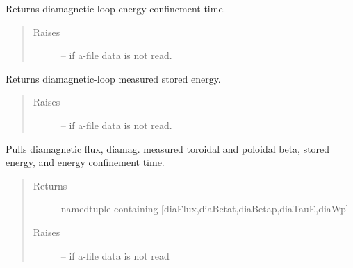 \documentclass[letterpaper,10pt,english]{sphinxmanual}
\begin{document}
\begin{fulllineitems}
\begin{fulllineitems}
\end{fulllineitems}


\begin{fulllineitems}
\label{eqtools:eqtools.eqdskreader.EqdskReader.getDiamagTauE}
Returns diamagnetic-loop energy confinement time.
\begin{quote}\begin{description}
\item[{Raises}] \leavevmode
{} -- if a-file data is not read.

\end{description}\end{quote}

\end{fulllineitems}


\begin{fulllineitems}
\label{eqtools:eqtools.eqdskreader.EqdskReader.getDiamagWp}
Returns diamagnetic-loop measured stored energy.
\begin{quote}\begin{description}
\item[{Raises}] \leavevmode
{} -- if a-file data is not read.

\end{description}\end{quote}

\end{fulllineitems}


\begin{fulllineitems}
\label{eqtools:eqtools.eqdskreader.EqdskReader.getDiamag}
Pulls diamagnetic flux, diamag. measured toroidal and poloidal beta, stored energy, and energy confinement time.
\begin{quote}\begin{description}
\item[{Returns}] \leavevmode
namedtuple containing {[}diaFlux,diaBetat,diaBetap,diaTauE,diaWp{]}

\item[{Raises}] \leavevmode
{} -- if a-file data is not read


\end{description}
\end{quote}
\end{fulllineitems}
\end{fulllineitems}
\end{document}
